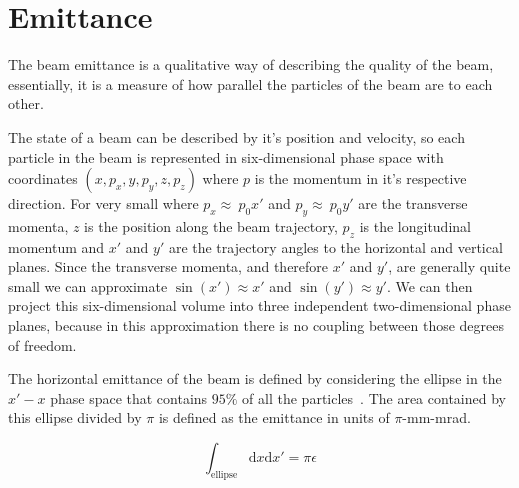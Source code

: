 \section{Emittance}

The beam emittance is a
qualitative way of describing the quality of the beam, essentially, it is a
measure of how parallel the particles of the beam are to each other.


The state of a beam can be described by it's position and velocity, so each
particle in the beam is represented in six-dimensional phase space with
coordinates \(\left(x,p_x,y,p_y,z,p_z\right)\) where \(p\) is the momentum in
it's respective direction. For very small 
where \(p_x\approx~p_0x'\) and
\(p_y\approx~p_0y'\) are the transverse momenta, \(z\) is the position along the
beam trajectory, \(p_z\) is the longitudinal momentum and \(x'\) and \(y'\) are
the trajectory angles to the horizontal and vertical planes. Since the
transverse momenta, and therefore \(x'\) and \(y'\), are generally quite small
we can approximate \(\sin\left(x'\right)\approx x'\) and
\(\sin\left(y'\right)\approx y'\). We can then project this six-dimensional
volume into three independent two-dimensional phase planes, because in this
approximation there is no coupling between those degrees of freedom.

The horizontal emittance of the beam is defined by considering the ellipse in
the \(x'-x\) phase space that contains \(95\%\) of all the
particles~\cite{buon1994beam}. The area contained by this ellipse divided by
\(\pi\) is defined as the emittance in units of \(\pi\)-mm-mrad.

\begin{equation}
	\int_{\text{ellipse}}\mathrm{d}x\mathrm{d}x' =\pi\epsilon
\end{equation}

